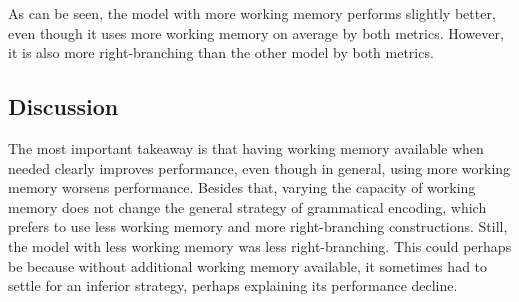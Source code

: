 As can be seen, the model with more working memory performs slightly better, even though it uses more working memory on average by both metrics. However, it is also more right-branching than the other model by both metrics.

\subsection{Discussion}
The most important takeaway is that having working memory available when needed clearly improves performance, even though in general, using more working memory worsens performance. Besides that, varying the capacity of working memory does not change the general strategy of grammatical encoding, which prefers to use less working memory and more right-branching constructions. Still, the model with less working memory was less right-branching. This could perhaps be because without additional working memory available, it sometimes had to settle for an inferior strategy, perhaps explaining its performance decline.